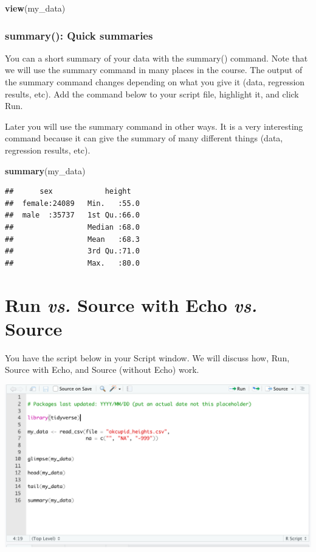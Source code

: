 \documentclass[
]{krantz}
\makeatletter
\newenvironment{Shaded}{\begin{snugshade}}{\end{snugshade}}
\newcommand{\KeywordTok}[1]{\textcolor[rgb]{0.27,0.27,0.27}{\textbf{#1}}}
\newcommand{\NormalTok}[1]{#1}
\newenvironment{kframe}{%
\medskip{}
\setlength{\fboxsep}{.8em}
 \def\at@end@of@kframe{}%
 \ifinner\ifhmode%
  \def\at@end@of@kframe{\end{minipage}}%
  \begin{minipage}{\columnwidth}%
 \fi\fi%
 \def\FrameCommand##1{\hskip\@totalleftmargin \hskip-\fboxsep
 \colorbox{shadecolor}{##1}\hskip-\fboxsep
     \hskip-\linewidth \hskip-\@totalleftmargin \hskip\columnwidth}%
 \MakeFramed {\advance\hsize-\width
   \@totalleftmargin\z@ \linewidth\hsize
   \@setminipage}}%
 {\par\unskip\endMakeFramed%
 \at@end@of@kframe}
\renewenvironment{Shaded}{\begin{kframe}}{\end{kframe}}
\makeatother
\begin{document}
\begin{Shaded}
\begin{Highlighting}[]
\KeywordTok{view}\NormalTok{(my_data)}
\end{Highlighting}
\end{Shaded}

\hypertarget{summary-quick-summaries}{%
\subsubsection{summary(): Quick summaries}\label{summary-quick-summaries}}

You can a short summary of your data with the summary() command. Note that we will use the summary command in many places in the course. The output of the summary command changes depending on what you give it (data, regression results, etc). Add the command below to your script file, highlight it, and click Run.

Later you will use the summary command in other ways. It is a very interesting command because it can give the summary of many different things (data, regression results, etc).

\begin{Shaded}
\begin{Highlighting}[]
\KeywordTok{summary}\NormalTok{(my_data)}
\end{Highlighting}
\end{Shaded}

\begin{verbatim}
##      sex            height    
##  female:24089   Min.   :55.0  
##  male  :35737   1st Qu.:66.0  
##                 Median :68.0  
##                 Mean   :68.3  
##                 3rd Qu.:71.0  
##                 Max.   :80.0
\end{verbatim}

\hypertarget{run-vs.-source-with-echo-vs.-source}{%
\section{\texorpdfstring{Run \emph{vs.} Source with Echo \emph{vs.} Source}{Run vs. Source with Echo vs. Source}}\label{run-vs.-source-with-echo-vs.-source}}

You have the script below in your Script window. We will discuss how, Run, Source with Echo, and Source (without Echo) work.

\includegraphics[width=0.5\linewidth,height=0.5\textheight]{first_time/images/script_all}
\end{document}
